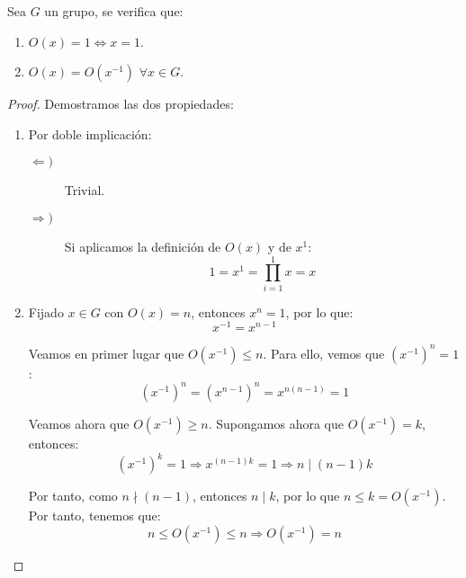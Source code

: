 \begin{prop}
    Sea $G$ un grupo, se verifica que:
    \begin{enumerate}
        \item $O(x)=1\Longleftrightarrow x=1$.
        \item $O(x)=O(x^{-1})$ $\forall x\in G$.
    \end{enumerate}
    \begin{proof}
        Demostramos las dos propiedades:
        \begin{enumerate}
            \item Por doble implicación:
                \begin{description}
                    \item [$\Longleftarrow)$] Trivial.
                    \item [$\Longrightarrow)$] Si aplicamos la definición de $O(x)$ y de $x^1$:
                        \begin{equation*}
                            1 = x^1 = \prod_{i=1}^{1} x = x
                        \end{equation*}
                \end{description}
            \item %
            Fijado $x\in G$ con $O(x)=n$, entonces $x^n = 1$, por lo que:
            \begin{equation*}
                x^{-1} = x^{n-1}
            \end{equation*}

            Veamos en primer lugar que $O(x^{-1})\leq n$. Para ello, vemos que $\left(x^{-1}\right)^{n}=1$:
            \begin{equation*}
                \left(x^{-1}\right)^{n} = \left(x^{n-1}\right)^{n} = x^{n(n-1)} = 1
            \end{equation*}

            Veamos ahora que $O(x^{-1})\geq n$. Supongamos ahora que $O(x^{-1})=k$, entonces:
            \begin{equation*}
                (x^{-1})^k = 1 \Longrightarrow x^{(n-1)k} = 1 \Longrightarrow n\mid (n-1)k
            \end{equation*}

            Por tanto, como $n \nmid (n-1)$, entonces $n\mid k$, por lo que $n\leq k=O(x^{-1})$. Por tanto, tenemos que:
            \begin{equation*}
                n\leq O(x^{-1})\leq n \Longrightarrow O(x^{-1}) = n
            \end{equation*}
        \end{enumerate}
    \end{proof}
\end{prop}

